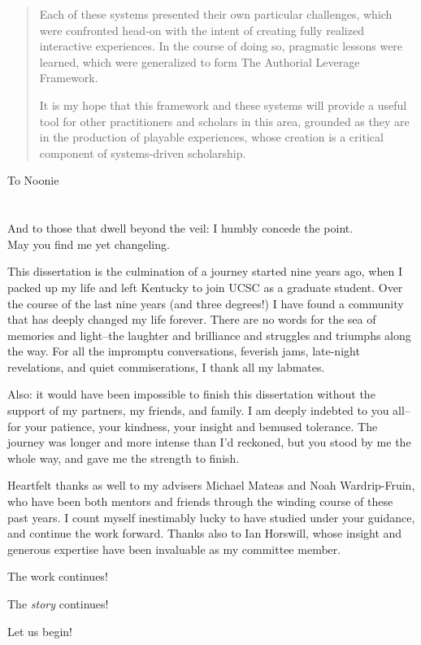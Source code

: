 \documentclass[11pt]{ucthesis}
\begin{document}
\begin{frontmatter}
\begin{abstract}
Each of these systems presented their own particular challenges, which were confronted head-on with the intent of creating fully realized interactive experiences. In the course of doing so, pragmatic lessons were learned, which were generalized to form The Authorial Leverage Framework.

It is my hope that this framework and these systems will provide a useful tool for other practitioners and scholars in this area, grounded as they are in the production of playable experiences, whose creation is a critical component of systems-driven scholarship.
\end{abstract}

\begin{dedication}
\null\vfil
{\large
\begin{center}
To Noonie
\\~\\~\\
And to those that dwell beyond the veil: I humbly concede the point.\\ 
May you find me yet changeling.
\end{center}}
\vfil\null
\end{dedication}


\begin{acknowledgements}

This dissertation is the culmination of a journey started nine years ago, when I packed up my life and left Kentucky to join UCSC as a graduate student. Over the course of the last nine years (and three degrees!) I have found a community that has deeply changed my life forever. There are no words for the sea of memories and light--the laughter and brilliance and struggles and triumphs along the way. For all the impromptu conversations, feverish jams, late-night revelations, and quiet commiserations, I thank all my labmates.

Also: it would have been impossible to finish this dissertation without the support of my partners, my friends, and family. I am deeply indebted to you all--for your patience, your kindness, your insight and bemused tolerance. The journey was longer and more intense than I'd reckoned, but you stood by me the whole way, and gave me the strength to finish.

Heartfelt thanks as well to my advisers Michael Mateas and Noah Wardrip-Fruin, who have been both mentors and friends through the winding course of these past years. I count myself inestimably lucky to have studied under your guidance, and continue the work forward. Thanks also to Ian Horswill, whose insight and generous expertise have been invaluable as my committee member. 

The work continues!

The \textit{story} continues!

Let us begin!


\end{acknowledgements}

\end{frontmatter}
\end{document}

